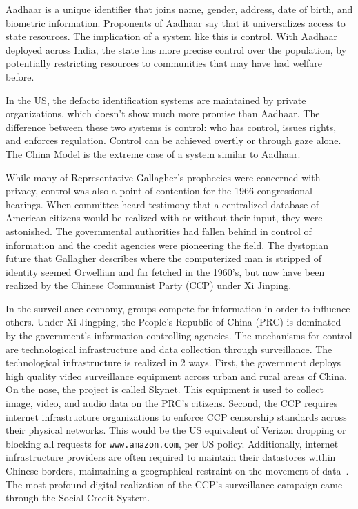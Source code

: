 Aadhaar is a unique identifier that joins name, gender, address, date of birth,
and biometric information. Proponents of Aadhaar say that it universalizes
access to state resources. The implication of a system like this is control.
With Aadhaar deployed across India, the state has more precise control over the
population, by potentially restricting resources to communities that may have
had welfare before.

In the US, the defacto identification systems are maintained by private
organizations, which doesn't show much more promise than Aadhaar. The
difference between these two systems is control: who has control, issues
rights, and enforces regulation. Control can be achieved overtly or
through gaze alone. The China Model is the extreme case of a system similar
to Aadhaar.

While many of Representative Gallagher's prophecies were concerned with
privacy, control was also a point of contention for the 1966 congressional
hearings. When committee heard testimony that a centralized database of
American citizens would be realized with or without their input, they were
astonished. The governmental authorities had fallen behind in control of
information and the credit agencies were pioneering the field. The dystopian
future that Gallagher describes where the computerized man is stripped of
identity seemed Orwellian and far fetched in the 1960's, but now have been
realized by the Chinese Communist Party (CCP) under Xi Jinping.

In the surveillance economy, groups compete for information in order to
influence others. Under Xi Jingping, the People's Republic of China (PRC) is
dominated by the government's information controlling agencies. The mechanisms
for control are technological infrastructure and data collection through
surveillance. The technological infrastructure is realized in 2 ways. First,
the government deploys high quality video surveillance equipment across urban
and rural areas of China. On the nose, the project is called Skynet. This
equipment is used to collect image, video, and audio data on the PRC's
citizens. Second, the CCP requires internet infrastructure organizations to
enforce CCP censorship standards across their physical networks. This would be the
US equivalent of Verizon dropping or blocking all requests for
\texttt{www.amazon.com}, per US policy. Additionally, internet infrastructure providers are
often required to maintain their datastores within Chinese borders, maintaining
a geographical restraint on the movement of data~\cite{qiang2019road}. The most
profound digital realization of the CCP's surveillance campaign came through
the Social Credit System.

